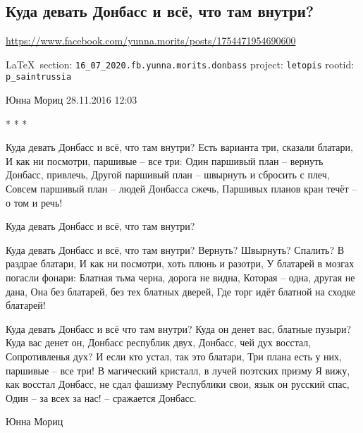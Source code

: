  
 
\subsection{Куда девать Донбасс и всё, что там внутри?}
\url{https://www.facebook.com/yunna.morits/posts/1754471954690600}
  
\vspace{0.5cm}
{\small\LaTeX~section: \verb|16_07_2020.fb.yunna.morits.donbass| project: \verb|letopis| rootid: \verb|p_saintrussia|}
\vspace{0.5cm}

Юнна Мориц
28.11.2016 12:03

* * *

\obeycr
Куда девать Донбасс и всё, что там внутри?
Есть варианта три, сказали блатари,
И как ни посмотри, паршивые – все три:
Один паршивый план – вернуть Донбасс, привлечь,
Другой паршивый план – швырнуть и сбросить с плеч,
Совсем паршивый план – людей Донбасса сжечь,
Паршивых планов кран течёт – о том и речь!

Куда девать Донбасс и всё, что там внутри?

Куда девать Донбасс и всё, что там внутри?
Вернуть? Швырнуть? Спалить? В раздрае блатари,
И как ни посмотри, хоть плюнь и разотри,
У блатарей в мозгах погасли фонари:
Блатная тьма черна, дорога не видна,
Которая – одна, другая не дана,
Она без блатарей, без тех блатных дверей,
Где торг идёт блатной на сходке блатарей!

Куда девать Донбасс и всё что там внутри?
Куда он денет вас, блатные пузыри?
Куда вас денет он, Донбасс республик двух,
Донбасс, чей дух восстал, Сопротивленья дух?
И если кто устал, так это блатари,
Три плана есть у них, паршивые – все три!
В магический кристалл, в лучей поэтских призму
Я вижу, как восстал Донбасс, не сдал фашизму
Республики свои, язык он русский спас,
Один – за всех за нас! – сражается Донбасс.

Юнна Мориц
\restorecr

